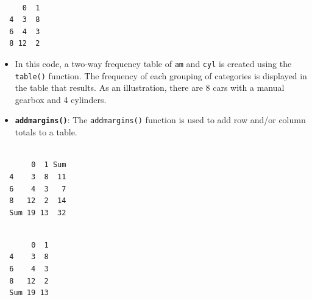 \documentclass[
  letterpaper,
  DIV=11,
  numbers=noendperiod]{scrreport}
\newenvironment{Shaded}{\begin{snugshade}}{\end{snugshade}}
\newcommand{\DecValTok}[1]{\textcolor[rgb]{0.68,0.00,0.00}{#1}}
\newcommand{\FunctionTok}[1]{\textcolor[rgb]{0.28,0.35,0.67}{#1}}
\newcommand{\NormalTok}[1]{\textcolor[rgb]{0.00,0.23,0.31}{#1}}
\newcommand{\SpecialCharTok}[1]{\textcolor[rgb]{0.37,0.37,0.37}{#1}}
\begin{document}
\begin{Shaded}
\end{Shaded}

\begin{verbatim}
   
     0  1
  4  3  8
  6  4  3
  8 12  2
\end{verbatim}

\begin{itemize}
\item
  In this code, a two-way frequency table of \texttt{am} and
  \texttt{cyl} is created using the \texttt{table()} function. The
  frequency of each grouping of categories is displayed in the table
  that results. As an illustration, there are 8 cars with a manual
  gearbox and 4 cylinders.
\item
  \textbf{\texttt{addmargins()}}: The \texttt{addmargins()} function is
  used to add row and/or column totals to a table.
\end{itemize}

\begin{Shaded}
\end{Shaded}

\begin{verbatim}
     
       0  1 Sum
  4    3  8  11
  6    4  3   7
  8   12  2  14
  Sum 19 13  32
\end{verbatim}

\begin{Shaded}
\end{Shaded}

\begin{verbatim}
     
       0  1
  4    3  8
  6    4  3
  8   12  2
  Sum 19 13
\end{verbatim}
\end{document}
